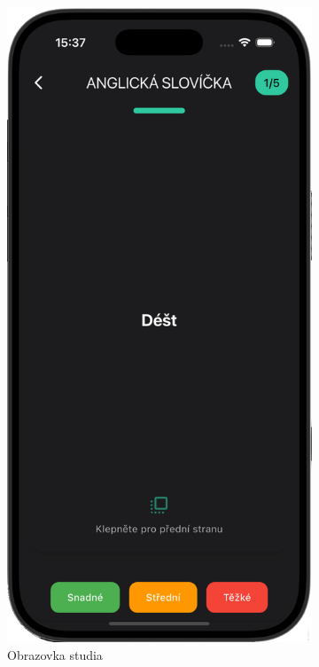 \documentclass[12pt, a4paper, oneside]{report}
\begin{document}
	\begin{figure}[h]
		\centering
		\begin{subfigure}[b]{0.48\textwidth}
			\includegraphics[width=0.75\linewidth]{../image/screen-study.png}
			\caption{Obrazovka studia}
			\label{fig:screen-study}
		\end{subfigure}
		\hfill
		\begin{subfigure}[b]{0.48\textwidth}

\end{subfigure}
\end{figure}
\end{document}
